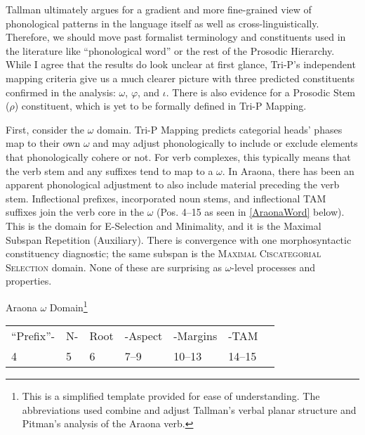 \documentclass[output=paper]{langscibook}
\begin{document}
Tallman ultimately argues for a gradient and more fine-grained view of phonological patterns in the language  itself as well as cross-linguistically. Therefore, we should move past formalist terminology and constituents used in the literature like ``phonological word'' or the rest of the Prosodic Hierarchy. While I agree that the results do look unclear at first glance, Tri-P's independent mapping criteria give us a much clearer picture with three predicted constituents confirmed in the analysis: $\omega$, $\varphi$, and $\iota$. There is also evidence for a Prosodic Stem ($\rho$) constituent, which is yet to be formally defined in Tri-P Mapping.

First, consider the $\omega$ domain. Tri-P Mapping predicts categorial heads' phases map to their own $\omega$ and may adjust phonologically to include or exclude elements that phonologically cohere or not. For verb complexes, this typically means that the verb stem and any suffixes tend to map to a $\omega$. In Araona, there has been an apparent phonological adjustment to also include material preceding the verb stem. Inflectional prefixes, incorporated noun stems, and inflectional TAM suffixes join the verb core in the $\omega$ (Pos. 4--15 as seen in \ref{AraonaWord} below). This is the domain for E-Selection and Minimality, and it is the Maximal Subspan Repetition (Auxiliary). There is convergence with one morphosyntactic constituency diagnostic; the same subspan is the {\textsc{Maximal Ciscategorial Selection}} domain. None of these are surprising as $\omega$-level processes and properties.

\ea
    \label{AraonaWord} Araona $\omega$ Domain\footnote{This is a simplified template provided for ease of understanding. The abbreviations used combine and adjust Tallman's verbal planar structure and Pitman's analysis of the Araona verb.} \\ 
        \begin{tabular}{lllllll}
       ``Prefix''- & N- & Root & -Aspect & -Margins & -TAM \\
       4 & 5 & 6 & 7--9 & 10--13 & 14--15
    \end{tabular}
\z
\end{document}
